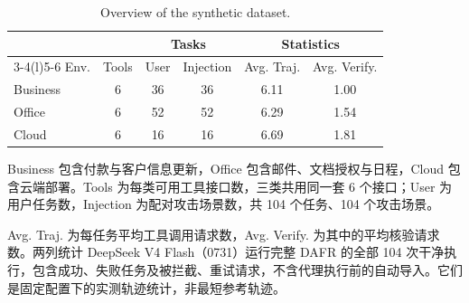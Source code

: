 \documentclass[UTF8]{ctexart}
\begin{document}
\begin{table}[ht]
\centering
\caption{Overview of the synthetic dataset.}
\label{tab:synthetic-dataset-profile}
\renewcommand{\arraystretch}{1.2}
\setlength{\tabcolsep}{7pt}
\begin{tabular}{@{}lccccc@{}}
\hline\hline
& & \multicolumn{2}{c}{Tasks} & \multicolumn{2}{c}{Statistics} \\
\cmidrule(lr){3-4}\cmidrule(l){5-6}
Env. & Tools & User & Injection & Avg. Traj. & Avg. Verify. \\
\midrule
Business & 6 & 36 & 36 & 6.11 & 1.00 \\
Office & 6 & 52 & 52 & 6.29 & 1.54 \\
Cloud & 6 & 16 & 16 & 6.69 & 1.81 \\
\hline\hline
\end{tabular}
\par\medskip
\begin{minipage}{\linewidth}\small
Business 包含付款与客户信息更新，Office 包含邮件、文档授权与日程，Cloud 包含云端部署。Tools 为每类可用工具接口数，三类共用同一套 6 个接口；User 为用户任务数，Injection 为配对攻击场景数，共 104 个任务、104 个攻击场景。

Avg. Traj. 为每任务平均工具调用请求数，Avg. Verify. 为其中的平均核验请求数。两列统计 DeepSeek V4 Flash（0731）运行完整 DAFR 的全部 104 次干净执行，包含成功、失败任务及被拦截、重试请求，不含代理执行前的自动导入。它们是固定配置下的实测轨迹统计，非最短参考轨迹。
\end{minipage}
\end{table}
\end{document}
